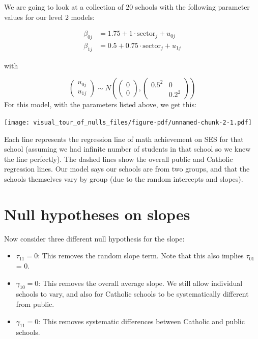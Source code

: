 \documentclass[
  letterpaper,
  DIV=11,
  numbers=noendperiod]{scrreprt}
\providecommand{\tightlist}{%
  \setlength{\itemsep}{0pt}\setlength{\parskip}{0pt}}\usepackage{longtable,booktabs,array}
\begin{document}
We are going to look at a collection of 20 schools with the following
parameter values for our level 2 models:

\[
\begin{aligned}
\beta_{0j} &= 1.75 + 1 \cdot \text{sector}_{j} + u_{0j} \\
\beta_{1j} &= 0.5 + 0.75 \cdot \text{sector}_{j} + u_{1j}
\end{aligned}
\]

with

\[
\begin{pmatrix}
u_{0j} \\
u_{1j}
\end{pmatrix}
\sim N \left(
\begin{pmatrix}
0 \\
0
\end{pmatrix},
\begin{pmatrix}
0.5^2 & 0 \\
 & 0.2^2
\end{pmatrix}
\right)
\] For this model, with the parameters listed above, we get this:

\begin{center}
\texttt{[image: visual\_tour\_of\_nulls\_files/figure-pdf/unnamed-chunk-2-1.pdf]}
\end{center}

Each line represents the regression line of math achievement on SES for
that school (assuming we had infinite number of students in that school
so we knew the line perfectly). The dashed lines show the overall public
and Catholic regression lines. Our model says our schools are from two
groups, and that the schools themselves vary by group (due to the random
intercepts and slopes).

\section{Null hypotheses on slopes}\label{null-hypotheses-on-slopes}

Now consider three different null hypothesis for the slope:

\begin{itemize}
\tightlist
\item
  \(\tau_{11} = 0\): This removes the random slope term. Note that this
  also implies \(\tau_{01}\) = 0.
\item
  \(\gamma_{10} = 0\): This removes the overall average slope. We still
  allow individual schools to vary, and also for Catholic schools to be
  systematically different from public.
\item
  \(\gamma_{11} = 0\): This removes systematic differences between
  Catholic and public schools.
\end{itemize}
\end{document}
